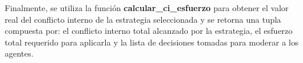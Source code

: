 Finalmente, se utiliza la función \textbf{calcular\_ci\_esfuerzo} para obtener el valor real del conflicto interno de la estrategia seleccionada y se retorna una tupla compuesta por: el conflicto interno total alcanzado por la estrategia, el esfuerzo total requerido para aplicarla y la lista de decisiones tomadas para moderar a los agentes.